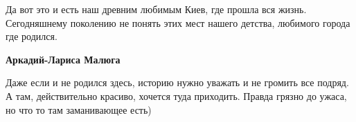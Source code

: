  
 
 
 
 




Да вот это и есть наш древним любимым Киев, где прошла вся жизнь. Сегодняшнему
поколению не понять этих мест нашего детства, любимого города где родился.


\textbf{Аркадий-Лариса Малюга} 

Даже если и не родился здесь, историю нужно уважать и не громить все подряд. А
там, действительно красиво, хочется туда приходить. Правда грязно до ужаса, но
что то там заманивающее есть)
